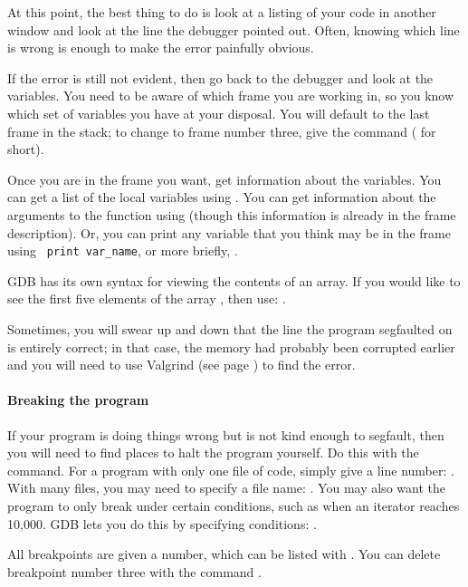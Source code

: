 \documentclass[12pt]{article}
\begin{document}
At this point, the best thing to do is look at a listing of your code
in another window and look at the line the debugger pointed out. Often,
knowing which line is wrong is enough to make the error painfully obvious.

If the error is still not evident, then go back to the debugger and look
at the variables. You need to be aware of which frame you are working in,
so you know which set of variables you have at your disposal.  You
will default to the last frame in the stack; to change to frame number
three, give the command  ( for short).

Once you are in the frame you want, get information about the variables. You can
get a list of the local variables using . You can get
information about the arguments to the function using 
(though this information is already in the frame description). Or, you
can print any variable that you think may be in the frame using {\tt
print var\_name}, or more briefly, . 

GDB has its own syntax for viewing the contents of an array. If you
would
like to see the first five elements of the array , then use:
.

Sometimes, you will swear up and down that the line the program segfaulted on is
entirely correct; in that case, the memory had probably been corrupted earlier and
you will need to use Valgrind (see page \pageref{valgrind}) to find the error.

\paragraph{Breaking the program} If your program is doing things wrong but is not kind
enough to segfault, then you will need to find places to halt the program
yourself. Do this with the  command. For a program with only
one file of code, simply give a line number: . With many
files, you may need to specify a file name: . You
may also want the program to only break under certain conditions, such
as when an iterator reaches 10,000. GDB lets you do this by specifying
conditions: .

All breakpoints are given a number, which can be listed with
. You can delete breakpoint number three with
the command .
\end{document}
